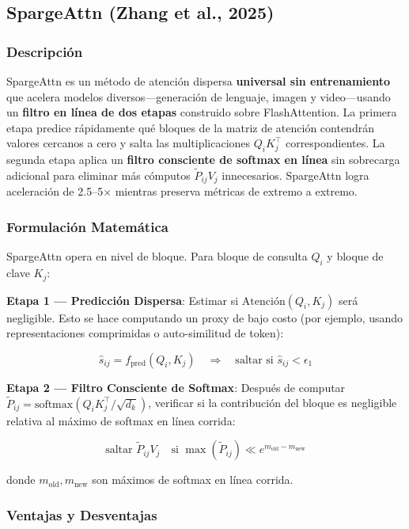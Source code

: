 \documentclass[11pt,a4paper]{article}
\begin{document}
\subsection{SpargeAttn (Zhang et al., 2025)}

\subsubsection{Descripción}

SpargeAttn es un método de atención dispersa \textbf{universal sin entrenamiento} que acelera modelos diversos—generación de lenguaje, imagen y video—usando un \textbf{filtro en línea de dos etapas} construido sobre FlashAttention. La primera etapa predice rápidamente qué bloques de la matriz de atención contendrán valores cercanos a cero y salta las multiplicaciones $Q_iK_j^\top$ correspondientes. La segunda etapa aplica un \textbf{filtro consciente de softmax en línea} sin sobrecarga adicional para eliminar más cómputos $\tilde{P}_{ij}V_j$ innecesarios. SpargeAttn logra aceleración de 2.5–5× mientras preserva métricas de extremo a extremo.

\subsubsection{Formulación Matemática}

SpargeAttn opera en nivel de bloque. Para bloque de consulta $Q_i$ y bloque de clave $K_j$:

\textbf{Etapa 1 — Predicción Dispersa}: Estimar si $\text{Atención}(Q_i, K_j)$ será negligible. Esto se hace computando un proxy de bajo costo (por ejemplo, usando representaciones comprimidas o auto-similitud de token):

$$
\hat{s}_{ij} = f_{\text{pred}}(Q_i, K_j) \quad \Rightarrow \quad \text{saltar si } \hat{s}_{ij} < \epsilon_1
$$

\textbf{Etapa 2 — Filtro Consciente de Softmax}: Después de computar $\tilde{P}_{ij} = \text{softmax}(Q_i K_j^\top / \sqrt{d_k})$, verificar si la contribución del bloque es negligible relativa al máximo de softmax en línea corrida:

$$
\text{saltar } \tilde{P}_{ij} V_j \quad \text{si } \max(\tilde{P}_{ij}) \ll e^{m_{\text{old}} - m_{\text{new}}}
$$

donde $m_{\text{old}}, m_{\text{new}}$ son máximos de softmax en línea corrida.

\subsubsection{Ventajas y Desventajas}
\end{document}
